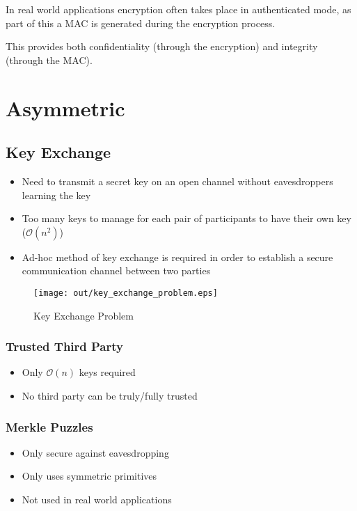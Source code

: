 \documentclass[a4paper]{article}
\begin{document}
In real world applications encryption often takes place in authenticated mode,
as part of this a MAC is generated during the encryption process.

This provides both confidentiality (through the encryption) and integrity
(through the MAC).

\section{Asymmetric}

\subsection{Key Exchange}

\begin{itemize}
  \item Need to transmit a secret key on an open channel without eavesdroppers
        learning the key
  \item Too many keys to manage for each pair of participants to have their own
        key ($\mathcal{O}(n^{2})$)
  \item Ad-hoc method of key exchange is required in order to establish a secure
        communication channel between two parties
\end{itemize}

\begin{figure}[h!]
  \centering
  \texttt{[image: out/key\_exchange\_problem.eps]}
  \caption{Key Exchange Problem}
  \label{fig:key_exchange_problem}
\end{figure}
\FloatBarrier

\subsubsection{Trusted Third Party}

\begin{itemize}
  \item Only $\mathcal{O}(n)$ keys required
  \item No third party can be truly/fully trusted
\end{itemize}

\subsubsection{Merkle Puzzles}

\begin{itemize}
  \item Only secure against eavesdropping
  \item Only uses symmetric primitives
  \item Not used in real world applications
\end{itemize}
\end{document}
